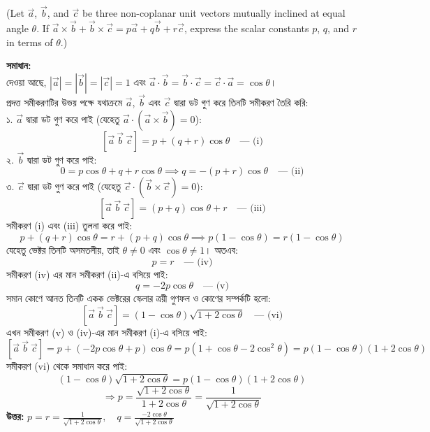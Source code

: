 \documentclass[12pt]{article}
\begin{document}
(Let $\vec{a}$, $\vec{b}$, and $\vec{c}$ be three non-coplanar unit vectors mutually inclined at equal angle $\theta$. If $\vec{a} \times \vec{b} + \vec{b} \times \vec{c} = p\vec{a} + q\vec{b} + r\vec{c}$, express the scalar constants $p$, $q$, and $r$ in terms of $\theta$.)

\begin{center}
\end{center}

\textbf{সমাধান:} \\
দেওয়া আছে, $|\vec{a}| = |\vec{b}| = |\vec{c}| = 1$ এবং $\vec{a} \cdot \vec{b} = \vec{b} \cdot \vec{c} = \vec{c} \cdot \vec{a} = \cos\theta$। \\
প্রদত্ত সমীকরণটির উভয় পক্ষে যথাক্রমে $\vec{a}$, $\vec{b}$ এবং $\vec{c}$ দ্বারা ডট গুণ করে তিনটি সমীকরণ তৈরি করি: \\
১. $\vec{a}$ দ্বারা ডট গুণ করে পাই (যেহেতু $\vec{a} \cdot (\vec{a} \times \vec{b}) = 0$):
$$[\vec{a} \ \vec{b} \ \vec{c}] = p + (q+r)\cos\theta \quad \text{--- (i)}$$
২. $\vec{b}$ দ্বারা ডট গুণ করে পাই:
$$0 = p\cos\theta + q + r\cos\theta \implies q = -(p+r)\cos\theta \quad \text{--- (ii)}$$
৩. $\vec{c}$ দ্বারা ডট গুণ করে পাই (যেহেতু $\vec{c} \cdot (\vec{b} \times \vec{c}) = 0$):
$$[\vec{a} \ \vec{b} \ \vec{c}] = (p+q)\cos\theta + r \quad \text{--- (iii)}$$
সমীকরণ (i) এবং (iii) তুলনা করে পাই:
$$p + (q+r)\cos\theta = r + (p+q)\cos\theta \implies p(1-\cos\theta) = r(1-\cos\theta)$$
যেহেতু ভেক্টর তিনটি অসমতলীয়, তাই $\theta \neq 0$ এবং $\cos\theta \neq 1$। অতএব:
$$p = r \quad \text{--- (iv)}$$
সমীকরণ (iv) এর মান সমীকরণ (ii)-এ বসিয়ে পাই:
$$q = -2p\cos\theta \quad \text{--- (v)}$$
সমান কোণে আনত তিনটি একক ভেক্টরের স্কেলার ত্রয়ী গুণফল ও কোণের সম্পর্কটি হলো:
$$[\vec{a} \ \vec{b} \ \vec{c}] = (1-\cos\theta)\sqrt{1+2\cos\theta} \quad \text{--- (vi)}$$
এখন সমীকরণ (v) ও (iv)-এর মান সমীকরণ (i)-এ বসিয়ে পাই:
$$[\vec{a} \ \vec{b} \ \vec{c}] = p + (-2p\cos\theta + p)\cos\theta = p(1+\cos\theta-2\cos^2\theta) = p(1-\cos\theta)(1+2\cos\theta)$$
সমীকরণ (vi) থেকে সমাধান করে পাই:
$$(1-\cos\theta)\sqrt{1+2\cos\theta} = p(1-\cos\theta)(1+2\cos\theta)$$
$$\Rightarrow p = \frac{\sqrt{1+2\cos\theta}}{1+2\cos\theta} = \frac{1}{\sqrt{1+2\cos\theta}}$$
\textbf{উত্তর:} $p = r = \frac{1}{\sqrt{1+2\cos\theta}}, \quad q = \frac{-2\cos\theta}{\sqrt{1+2\cos\theta}}$
\end{document}

